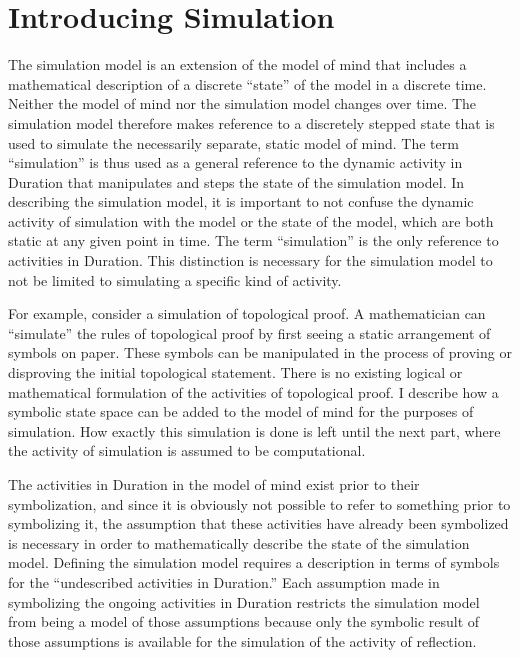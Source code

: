 \chapter{Introducing Simulation}
\label{chapter:introducting_simulation}

The simulation model is an extension of the model of mind that
includes a mathematical description of a discrete ``state'' of the
model in a discrete time.  Neither the model of mind nor the
simulation model changes over time.  The simulation model therefore
makes reference to a discretely stepped state that is used to simulate
the necessarily separate, static model of mind.  The term
``simulation'' is thus used as a general reference to the dynamic
activity in Duration that manipulates and steps the state of the
simulation model.  In describing the simulation model, it is important
to not confuse the dynamic activity of simulation with the model or
the state of the model, which are both static at any given point in
time.  The term ``simulation'' is the only reference to activities in
Duration.  This distinction is necessary for the simulation model to
not be limited to simulating a specific kind of activity.

For example, consider a simulation of topological proof.  A
mathematician can ``simulate'' the rules of topological proof by first
seeing a static arrangement of symbols on paper.  These symbols can be
manipulated in the process of proving or disproving the initial
topological statement.  There is no existing logical or mathematical
formulation of the activities of topological proof.  I describe how a
symbolic state space can be added to the model of mind for the
purposes of simulation.  How exactly this simulation is done is left
until the next part, where the activity of simulation is assumed to be
computational.

The activities in Duration in the model of mind exist prior to their
symbolization, and since it is obviously not possible to refer to
something prior to symbolizing it, the assumption that these
activities have already been symbolized is necessary in order to
mathematically describe the state of the simulation model.  Defining
the simulation model requires a description in terms of symbols for
the ``undescribed activities in Duration.''  Each assumption made in
symbolizing the ongoing activities in Duration restricts the
simulation model from being a model of those assumptions because only
the symbolic result of those assumptions is available for the
simulation of the activity of reflection.

